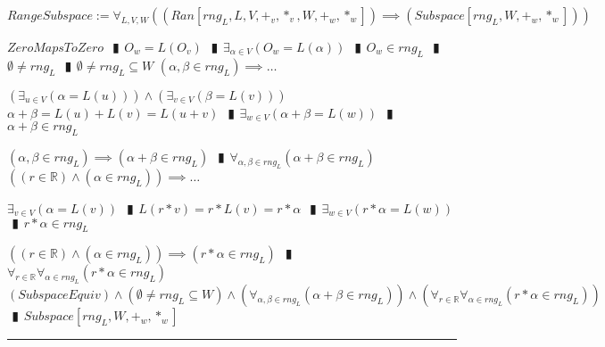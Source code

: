 \documentclass{book}
\newcommand{\abr}{:=}
\newcommand{\pipe}{$\phantom{(}\vrectangleblack\phantom{)}$}
\newcommand{\pr}[1]{\left(#1\right)}
\begin{document}
$RangeSubspace \abr \forall_{L, V, W}\pr{(Ran[rng_L, L, V, +_v, *_v, W, +_w, *_w]) \implies (Subspace[rng_L, W, +_w, *_w])}$
\begin{enumerate}
  \lit $ZeroMapsToZero$ \pipe $O_w = L(O_v)$ \pipe $\exists_{\alpha \in V}\pr{O_w = L(\alpha)}$ \pipe $O_w \in rng_L$ \pipe $\emptyset \neq rng_L$ \pipe $\emptyset \neq rng_L \subseteq W$
  \lit $(\alpha, \beta \in rng_L) \implies \ldots$
  \begin{enumerate}
    \lit $\pr{\exists_{u \in V}\pr{\alpha = L(u)}} \land \pr{\exists_{v \in V}\pr{\beta = L(v)}}$
    \lit $\alpha + \beta = L(u) + L(v) = L(u + v)$ \pipe $\exists_{w \in V}\pr{\alpha + \beta = L(w)}$ \pipe $\alpha + \beta \in rng_L$
  \end{enumerate}
  \lit $(\alpha, \beta \in rng_L) \implies (\alpha + \beta \in rng_L)$ \pipe $\forall_{\alpha, \beta \in rng_L}(\alpha + \beta \in rng_L)$
  \lit $\pr{(r \in \mathbb{R}) \land (\alpha \in rng_L)} \implies \ldots$
  \begin{enumerate}
    \lit $\exists_{v \in V}\pr{\alpha = L(v)}$ \pipe $L(r * v) = r * L(v) = r * \alpha$ \pipe $\exists_{w \in V}\pr{r * \alpha = L(w)}$ \pipe $r * \alpha \in rng_L$
  \end{enumerate}
  \lit $\pr{(r \in \mathbb{R}) \land (\alpha \in rng_L)} \implies (r * \alpha \in rng_L)$ \pipe $\forall_{r \in \mathbb{R}} \forall_{\alpha \in rng_L}(r * \alpha \in rng_L)$
  \lit $(SubspaceEquiv) \land (\emptyset \neq rng_L \subseteq W) \land \pr{\forall_{\alpha, \beta \in rng_L}(\alpha + \beta \in rng_L)} \land \pr{\forall_{r \in \mathbb{R}} \forall_{\alpha \in rng_L}(r * \alpha \in rng_L)}$ \pipe $Subspace[rng_L, W, +_w, *_w]$
\end{enumerate} \vspace{.75mm} \hrule \vspace{.75mm} \ \\ 
\end{document}
